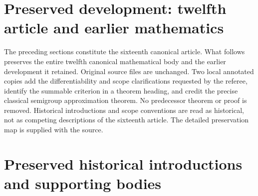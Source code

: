 \newif\ifcomplete\completetrue


\clearpage
\section*{Preserved development: twelfth article and earlier mathematics}
The preceding sections constitute the sixteenth canonical article.
What follows preserves the entire twelfth canonical mathematical body
and the earlier development it retained. Original source files are
unchanged. Two local annotated copies add the differentiability and
scope clarifications requested by the referee, identify the summable
criterion in a theorem heading, and credit the precise classical
semigroup approximation theorem. No predecessor theorem or proof is
removed. Historical introductions and scope conventions are read as
historical, not as competing descriptions of the sixteenth article.
The detailed preservation map is supplied with the source.

\clearpage
\section*{Preserved historical introductions and supporting bodies}


























